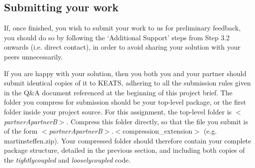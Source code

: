 \documentclass[11pt]{article}
\begin{document}
\subsection{Submitting your work}

If, once finished, you wish to submit your work to us for preliminary feedback, you should do so by following the `Additional Support' steps from Step 3.2 onwards (i.e. direct contact), in order to avoid sharing your solution with your peers unnecessarily.

If you are happy with your solution, then you both you and your partner should submit identical copies of it to KEATS, adhering to all the submission rules given in the Q\&A document referenced at the beginning of this project brief. The folder you compress for submission should be your top-level package, or the first folder inside your project source. For this assignment, the top-level folder is $<$\emph{partnerApartnerB}$>$. Compress this folder directly, so that the file you submit is of the form $<$\emph{partnerApartnerB}$>$.$<$compression\_extension$>$ (e.g. martinsteffen.zip). Your compressed folder should therefore contain your complete package structure, detailed in the previous section, and including both copies of the \emph{tightlycoupled} and \emph{looselycoupled} code.
\end{document}
